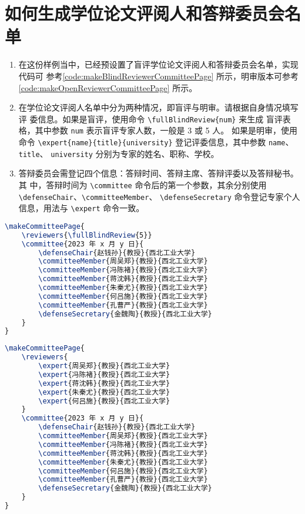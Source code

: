 \documentclass[lang=chs, degree=phd, blindreview=false, winfonts=true, academic=true]{yanputhesis}
\begin{document}
\section{如何生成学位论文评阅人和答辩委员会名单}

\begin{enumerate}
    \setlength{\itemsep}{0pt}
    \item 在这份样例当中，已经预设置了盲评学位论文评阅人和答辩委员会名单，实现代码可
          参考\autoref{code:makeBlindReviewerCommitteePage} 所示，明审版本可参考
          \autoref{code:makeOpenReviewerCommitteePage} 所示。
    \item 在学位论文评阅人名单中分为两种情况，即盲评与明审。请根据自身情况填写评
          委信息。如果是盲评，使用命令 \lstinline`\fullBlindReview{num}` 来生成
          盲评表格，其中参数 \lstinline`num` 表示盲评专家人数，一般是 3 或 5 人。
          如果是明审，使用命令 \lstinline`\expert{name}{title}{university}`
          登记评委信息，其中参数 \lstinline`name`、\lstinline`title`、
          \lstinline`university` 分别为专家的姓名、职称、学校。
    \item 答辩委员会需登记四个信息：答辩时间、答辩主席、答辩评委以及答辩秘书。其
          中，答辩时间为 \lstinline`\committee` 命令后的第一个参数，其余分别使用
          \lstinline`\defenseChair`、\lstinline`\committeeMember`、
          \lstinline`\defenseSecretary` 命令登记专家个人信息，用法与
          \lstinline`\expert` 命令一致。
\end{enumerate}

\begin{lstlisting}[language={TeX}, label={code:makeBlindReviewerCommitteePage},
    caption={盲评样例 makeBlindReviewerCommitteePage.tex}]
\makeCommitteePage{
    \reviewers{\fullBlindReview{5}}
    \committee{2023 年 x 月 y 日}{
        \defenseChair{赵钱孙}{教授}{西北工业大学}
        \committeeMember{周吴郑}{教授}{西北工业大学}
        \committeeMember{冯陈褚}{教授}{西北工业大学}
        \committeeMember{蒋沈韩}{教授}{西北工业大学}
        \committeeMember{朱秦尤}{教授}{西北工业大学}
        \committeeMember{何吕施}{教授}{西北工业大学}
        \committeeMember{孔曹严}{教授}{西北工业大学}
        \defenseSecretary{金魏陶}{教授}{西北工业大学}
    }
}
\end{lstlisting}

\begin{lstlisting}[language={TeX}, label={code:makeOpenReviewerCommitteePage},
    caption={明审样例 makeOpenReviewerCommitteePage.tex}]
\makeCommitteePage{
    \reviewers{
        \expert{周吴郑}{教授}{西北工业大学}
        \expert{冯陈褚}{教授}{西北工业大学}
        \expert{蒋沈韩}{教授}{西北工业大学}
        \expert{朱秦尤}{教授}{西北工业大学}
        \expert{何吕施}{教授}{西北工业大学}
    }
    \committee{2023 年 x 月 y 日}{
        \defenseChair{赵钱孙}{教授}{西北工业大学}
        \committeeMember{周吴郑}{教授}{西北工业大学}
        \committeeMember{冯陈褚}{教授}{西北工业大学}
        \committeeMember{蒋沈韩}{教授}{西北工业大学}
        \committeeMember{朱秦尤}{教授}{西北工业大学}
        \committeeMember{何吕施}{教授}{西北工业大学}
        \committeeMember{孔曹严}{教授}{西北工业大学}
        \defenseSecretary{金魏陶}{教授}{西北工业大学}
    }
}
\end{lstlisting}
\end{document}
